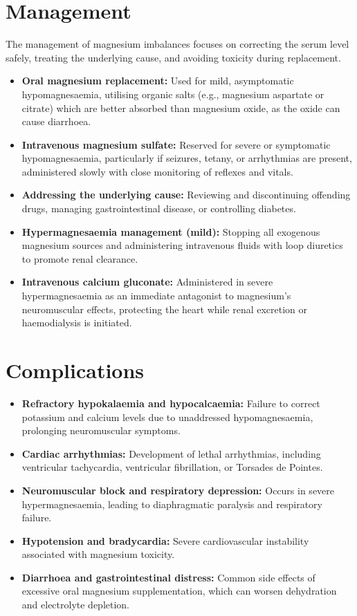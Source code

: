 \section*{Management}
The management of magnesium imbalances focuses on correcting the serum level safely, treating the underlying cause, and avoiding toxicity during replacement.
\begin{itemize}
    \item \textbf{Oral magnesium replacement:} Used for mild, asymptomatic hypomagnesaemia, utilising organic salts (e.g., magnesium aspartate or citrate) which are better absorbed than magnesium oxide, as the oxide can cause diarrhoea.
    \item \textbf{Intravenous magnesium sulfate:} Reserved for severe or symptomatic hypomagnesaemia, particularly if seizures, tetany, or arrhythmias are present, administered slowly with close monitoring of reflexes and vitals.
    \item \textbf{Addressing the underlying cause:} Reviewing and discontinuing offending drugs, managing gastrointestinal disease, or controlling diabetes.
    \item \textbf{Hypermagnesaemia management (mild):} Stopping all exogenous magnesium sources and administering intravenous fluids with loop diuretics to promote renal clearance.
    \item \textbf{Intravenous calcium gluconate:} Administered in severe hypermagnesaemia as an immediate antagonist to magnesium's neuromuscular effects, protecting the heart while renal excretion or haemodialysis is initiated.
\end{itemize}

\section*{Complications}
\begin{itemize}
    \item \textbf{Refractory hypokalaemia and hypocalcaemia:} Failure to correct potassium and calcium levels due to unaddressed hypomagnesaemia, prolonging neuromuscular symptoms.
    \item \textbf{Cardiac arrhythmias:} Development of lethal arrhythmias, including ventricular tachycardia, ventricular fibrillation, or Torsades de Pointes.
    \item \textbf{Neuromuscular block and respiratory depression:} Occurs in severe hypermagnesaemia, leading to diaphragmatic paralysis and respiratory failure.
    \item \textbf{Hypotension and bradycardia:} Severe cardiovascular instability associated with magnesium toxicity.
    \item \textbf{Diarrhoea and gastrointestinal distress:} Common side effects of excessive oral magnesium supplementation, which can worsen dehydration and electrolyte depletion.
\end{itemize}

